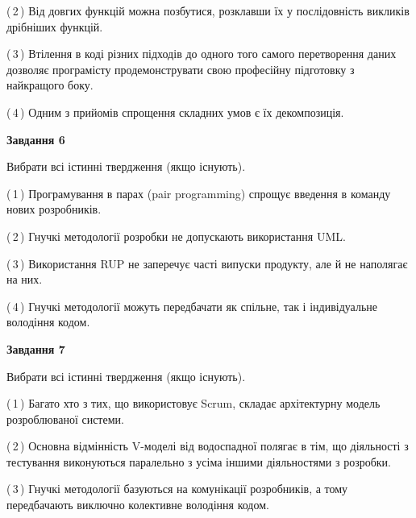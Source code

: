 \documentclass[10pt, ukrainian]{article}
\begin{document}
{\begin {large}
(\,2\,) Від довгих функцій можна позбутися, розклавши їх у послідовність викликів дрібніших функцій. %



(\,3\,) Втілення в коді різних підходів до одного того самого перетворення даних дозволяє програмісту продемонструвати свою професійну підготовку з найкращого боку. %



(\,4\,) Одним з прийомів спрощення складних умов є їх декомпозиція. %

\newpage

{\begin {center}\textbf{Завдання 6}\end {center}}\par
Вибрати всі істинні твердження (якщо існують).\par
\vspace{2mm}



(\,1\,) Програмування в парах (pair programming) спрощує введення в команду нових розробників. %



(\,2\,) Гнучкі методології розробки не допускають використання UML. %



(\,3\,) Використання RUP не заперечує часті випуски продукту, але й не наполягає на них. %



(\,4\,) Гнучкі методології можуть передбачати як спільне, так і індивідуальне володіння кодом. %


{\begin {center}\textbf{Завдання 7}\end {center}}\par
Вибрати всі істинні твердження (якщо існують).\par
\vspace{2mm}



(\,1\,) Багато хто з тих, що використовує Scrum, складає архітектурну модель розроблюваної системи. %



(\,2\,) Основна відмінність V-моделі від водоспадної полягає в тім, що діяльності з тестування виконуються паралельно з усіма іншими діяльностями з розробки. %



(\,3\,) Гнучкі методології базуються на комунікації розробників, а тому передбачають виключно колективне володіння кодом. %




\end{large}}
\end{document}
